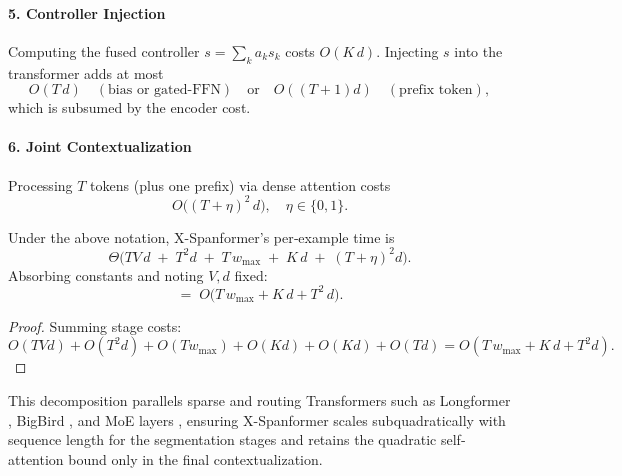 \paragraph{5. Controller Injection}
Computing the fused controller \(s=\sum_k a_k s_k\) costs \(O(K\,d)\).  Injecting \(s\) into the transformer adds at most
\[
O(T\,d)\quad(\text{bias or gated‐FFN})
\quad\text{or}\quad
O((T+1)d)\quad(\text{prefix token}),
\]
which is subsumed by the encoder cost.

\paragraph{6. Joint Contextualization}
Processing \(T\) tokens (plus one prefix) via dense attention costs
\[
O\bigl((T+\eta)^2\,d\bigr),
\quad \eta\in\{0,1\}.
\]

\begin{proposition}
	Under the above notation, X-Spanformer’s per‐example time is
	\[
	\Theta\bigl(TV\,d\;+\;T^2d\;+\;T\,w_{\max}\;+\;K\,d\;+\;(T+\eta)^2d\bigr).
	\]
	Absorbing constants and noting \(V, d\) fixed:
	\[
	=\;O\bigl(T\,w_{\max} + K\,d + T^2\,d\bigr).
	\]
\end{proposition}

\begin{proof}
	Summing stage costs:
	\[
	O(TVd) + O(T^2d) + O(Tw_{\max}) + O(Kd) + O(Kd) + O(Td) = O(T\,w_{\max}+K\,d+T^2d).
	\]
\end{proof}

This decomposition parallels sparse and routing Transformers such as Longformer \cite{beltagy2020longformer}, BigBird \cite{zaheer2020bigbird}, and MoE layers \cite{shazeer2017outrageously,ainslie2023transformers}, ensuring X-Spanformer scales subquadratically with sequence length for the segmentation stages and retains the quadratic self‐attention bound only in the final contextualization.